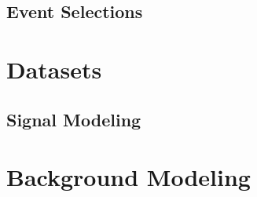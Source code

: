 
		\subsection{Event Selections}\label{ssec:event-selection}

	\section{Datasets}\label{sec:datasets}

		\subsection{Signal Modeling}\label{ssec:sig-modeling}

	\section{Background Modeling}\label{sec:bkg-modeling}

